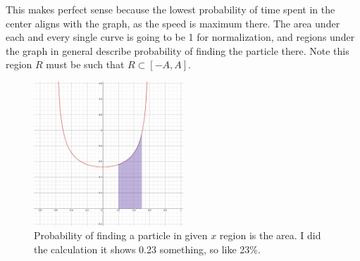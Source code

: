 \documentclass[letter]{article}
\begin{document}
	This makes perfect sense because the lowest probability of time spent in the center aligns with the graph, as the speed is maximum there. The area under each and every single curve is going to be 1 for normalization, and regions under the graph in general describe probability of finding the particle there. Note this region $R$ must be such that $R \subset [-A,A]$. 

\begin{figure}[H]
	\centering
	\includegraphics[width=0.5\textwidth]{ss/ncl03.png}
	\caption{Probability of finding a particle in given $x$ region is the area. I did the calculation it shows 0.23 something, so like 23\%.}
	\label{fig:ss-ncl03-png}
\end{figure}
\end{document}
